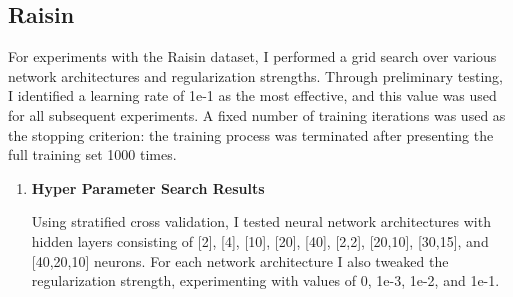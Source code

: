 \documentclass[letterpaper]{article}
\begin{document}
\newpage

\newpage
\subsection{Raisin}

For experiments with the Raisin dataset, I performed a grid search over various network architectures and regularization strengths. Through preliminary testing, I identified a learning rate of 1e-1 as the most effective, and this value was used for all subsequent experiments. A fixed number of training iterations was used as the stopping criterion: the training process was terminated after presenting the full training set 1000 times.

\begin{enumerate}
    \item \textbf{Hyper Parameter Search Results}

     Using stratified cross validation, I tested neural network architectures with hidden layers consisting of [2], [4], [10], [20], [40], [2,2], [20,10], [30,15], and [40,20,10] neurons. For each network architecture I also tweaked the regularization strength, experimenting with values of 0, 1e-3, 1e-2, and 1e-1.


\end{enumerate}
\end{document}
